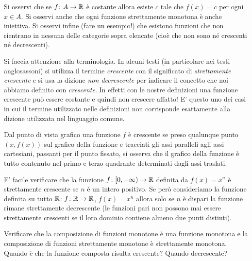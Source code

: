 Si osservi che se $f\colon A \to \mathbb R$ è costante allora esiste $c$ tale che
$f(x)=c$ per ogni $x\in A$. Si osservi anche che ogni funzione strettamente monotona è anche iniettiva. Si osservi infine (fare un esempio!) che esistono funzioni che non rientrano in nessuna delle categorie sopra elencate (cioè che non sono né crescenti né decrescenti).

Si faccia attenzione alla terminologia.
In alcuni testi (in particolare nei testi anglosassoni) si utilizza il termine
\emph{crescente} con il significato di \emph{strettamente crescente} e si usa la dizione \emph{non decrescente} per indicare il concetto che noi abbiamo definito con \emph{crescente}. In
effetti con le nostre definizioni una funzione crescente può essere costante
e quindi non crescere affatto!
E' questo uno dei casi in cui il termine utilizzato nelle definizioni non corrisponde esattamente alla dizione utilizzata
nel linguaggio comune.

Dal punto di vista grafico una funzione $f$ è crescente
se preso qualunque punto $(x,f(x))$ sul grafico della funzione
e tracciati gli assi paralleli agli assi cartesiani, passanti
per il punto fissato, si osserva che il grafico della funzione
è tutto contenuto nel primo e terzo quadrante determinati
dagli assi traslati.

E' facile verificare che la funzione $f\colon [0,+\infty)\to \mathbb R$
definita da $f(x)=x^n$
è strettamente crescente se $n$ è un intero positivo.
Se però consideriamo la funzione definita su tutto
$\mathbb R$: $f\colon \mathbb R \to \mathbb R$,
$f(x)=x^n$ allora solo se $n$ è dispari la funzione rimane
strettamente decrescente
(le funzioni pari non possono mai essere strettamente crescenti se
il loro dominio contiene almeno due punti distinti).

\begin{exercise}
Verificare che la composizione di funzioni monotone è una
funzione monotona e la composizione di funzioni strettamente
monotone è strettamente monotona.
Quando è che la funzione composta risulta crescente?
Quando decrescente?
\end{exercise}

